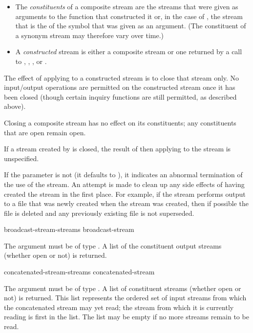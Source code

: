 \begin{defun}[Function]
\begin{new}
\begin{itemize}
\item
The \emph{constituents} of a composite stream are the streams that were given
as arguments to the function that constructed it or, in the case of
, the stream that is the  of
the symbol that was given as an argument.  (The constituent of
a synonym stream may therefore vary over time.)

\item
A \emph{constructed} stream is either a composite stream or one returned
by a call to , ,
, or
.
\end{itemize}

The effect of applying  to a constructed stream is to close
that stream only.  No input/output operations are permitted on the
constructed stream once it has been closed (though certain inquiry
functions are still permitted, as described above).

Closing a composite stream has no effect on its constituents;
any constituents that are open remain open.

If a stream created by  is closed,
the result of then applying  to the
stream is unspecified.
\end{new}

If the  parameter is not {\false} (it defaults to {\false}), it
indicates an abnormal termination of the use of the stream.  An attempt
is made to clean up any side effects of having created the stream in the
first place.  For example, if the stream performs output to a file
that was newly created when the stream was created, then if possible the
file is deleted and any previously existing file is not superseded.
\end{defun}

\begin{defun}[Function]
broadcast-stream-streams broadcast-stream

The argument must be of type .
A list of the constituent output streams (whether open or not) is returned.
\end{defun}


\begin{defun}[Function]
concatenated-stream-streams concatenated-stream

The argument must be of type .
A list of constituent streams (whether open or not) is returned.
This list represents the ordered set of input streams from which
the concatenated stream may yet read; the stream from which it is
currently reading is first in the list.  The list may be empty
if no more streams remain to be read.
\end{defun}


